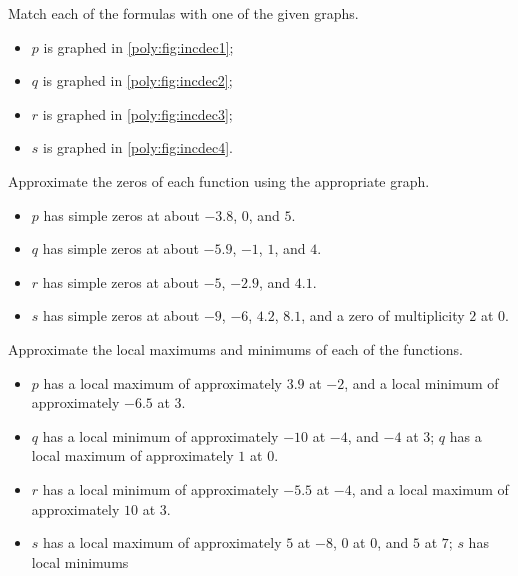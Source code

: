 \begin{exercises}
\begin{problem}
	 \begin{subproblem}
		 Match each of the formulas with one of the given graphs.
		 \begin{shortsolution}
			 \begin{itemize}
				 \item $p$ is graphed in \vref{poly:fig:incdec1};
				 \item $q$ is graphed in \vref{poly:fig:incdec2};
				 \item $r$ is graphed in \vref{poly:fig:incdec3};
				 \item $s$ is graphed in \vref{poly:fig:incdec4}.
			 \end{itemize}
		 \end{shortsolution}
	 \end{subproblem}
	 \begin{subproblem}
		 Approximate the zeros of each function using the appropriate graph.
		 \begin{shortsolution}
			 \begin{itemize}
				 \item $p$ has simple zeros at about $-3.8$, $0$, and $5$.
				 \item $q$ has simple zeros at about $-5.9$, $-1$, $1$, and $4$.
				 \item $r$ has simple zeros at about $-5$, $-2.9$, and $4.1$.
				 \item $s$ has simple zeros at about $-9$, $-6$, $4.2$, $8.1$, and a zero of multiplicity $2$ at $0$.
			 \end{itemize}
		 \end{shortsolution}
	 \end{subproblem}
	 \begin{subproblem}
		 Approximate the local maximums and minimums of each of the functions.
		 \begin{shortsolution}
			 \begin{itemize}
				 \item $p$ has a local maximum of approximately $3.9$ at $-2$, and a local minimum of approximately $-6.5$ at $3$.
				 \item $q$ has a local minimum of approximately $-10$ at $-4$, and $-4$ at $3$; $q$ has a local maximum of approximately $1$ at $0$.
				 \item $r$ has a local minimum of approximately $-5.5$ at $-4$, and a local maximum of approximately $10$ at $3$.
				 \item $s$ has a local maximum of approximately $5$ at $-8$, $0$ at $0$, and $5$ at  $7$; $s$ has local minimums

\end{itemize}
\end{shortsolution}
\end{subproblem}
\end{problem}
\end{exercises}
